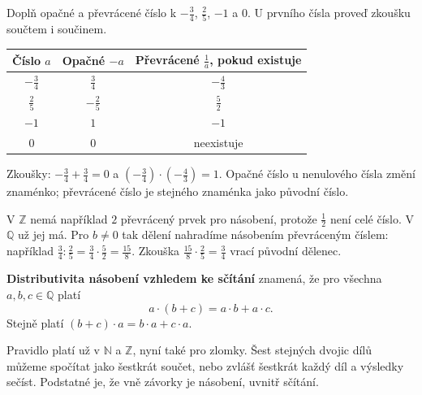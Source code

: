 \documentclass[11pt,a4paper]{article}
\begin{document}
\begin{prikladReseniBox}[title={Příklad 3},breakable=false]
Doplň opačné a převrácené číslo k $-\frac34$, $\frac25$, $-1$ a $0$.
U prvního čísla proveď zkoušku součtem i součinem.
\tcblower
\begin{center}
\begin{tabular}{ccc}
\toprule
Číslo $a$ & Opačné $-a$ & Převrácené $\frac1a$, pokud existuje\\
\midrule
$-\frac34$ & $\frac34$ & $-\frac43$\\
$\frac25$ & $-\frac25$ & $\frac52$\\
$-1$ & $1$ & $-1$\\
$0$ & $0$ & neexistuje\\
\bottomrule
\end{tabular}
\end{center}
Zkoušky: $-\frac34+\frac34=0$ a
$(-\frac34)\cdot(-\frac43)=1$. Opačné číslo u nenulového čísla
změní znaménko; převrácené číslo je stejného znaménka jako původní číslo.
\end{prikladReseniBox}

V $\mathbb Z$ nemá například $2$ převrácený prvek pro násobení,
protože $\frac12$ není celé číslo. V $\mathbb Q$ už jej má.
Pro $b\ne0$ tak dělení nahradíme násobením převráceným číslem:
například $\frac34:\frac25=\frac34\cdot\frac52=\frac{15}{8}$.
Zkouška $\frac{15}{8}\cdot\frac25=\frac34$ vrací původní dělenec.


\begin{definiceBox}[title={Věta - Distributivní zákon}]
\textbf{Distributivita násobení vzhledem ke sčítání} znamená, že pro
všechna $a,b,c\in\mathbb Q$ platí
\[
a\cdot(b+c)=a\cdot b+a\cdot c.
\]
Stejně platí $(b+c)\cdot a=b\cdot a+c\cdot a$.
\end{definiceBox}

Pravidlo platí už v $\mathbb N$ a $\mathbb Z$, nyní také pro zlomky.
Šest stejných dvojic dílů můžeme spočítat jako šestkrát součet,
nebo zvlášť šestkrát každý díl a výsledky sečíst. Podstatné je,
že vně závorky je násobení, uvnitř sčítání.
\end{document}
